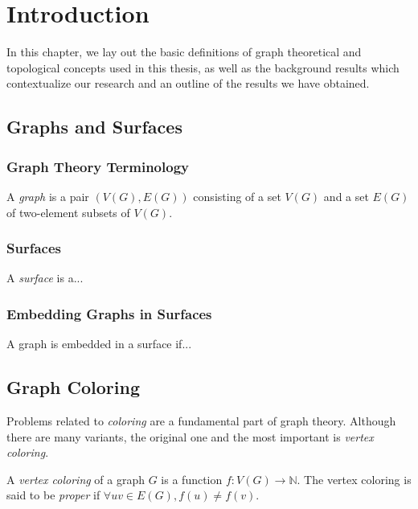\chapter{Introduction}

In this chapter, we lay out the basic definitions of graph theoretical and topological concepts used in this thesis, as well as the background results which contextualize our research and an outline of the results we have obtained.


\section{Graphs and Surfaces}

\subsection{Graph Theory Terminology}

A \textit{graph} is a pair $(V(G), E(G))$ consisting of a set $V(G)$ and a set $E(G)$ of two-element subsets of $V(G)$. 


\subsection{Surfaces}

A \textit{surface} is a...


\subsection{Embedding Graphs in Surfaces}

A graph is embedded in a surface if...





\section{Graph Coloring}

Problems related to \emph{coloring} are a fundamental part of graph theory. Although there are many variants, the original one and the most important is \emph{vertex coloring}.

\begin{definition}
A \emph{vertex coloring} of a graph $G$ is a function $f : V(G) \rightarrow \mathbb{N}$. The vertex coloring is said to be \emph{proper} if $\forall uv \in E(G), f(u) \neq f(v)$. 
\end{definition}

